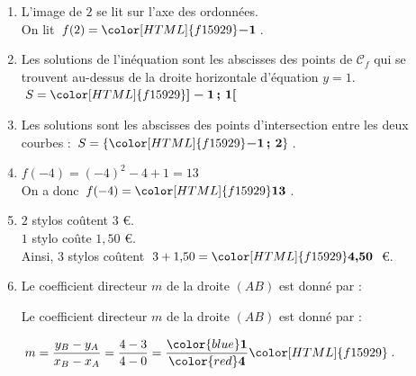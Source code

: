 \documentclass[a4paper,11pt,landscape,exos]{nsi} %
\begin{document}
\newpage

\begin{multicols}{2}
\maketitle

\begin{enumerate}[]

\item L'image de $2$ se lit sur l'axe des ordonnées. \\
              On lit $f(2)={\color[HTML]{f15929}\boldsymbol{-1}}$. 
\item Les solutions de l'inéquation sont les abscisses des points de $\mathcal{C}_f$ qui se trouvent au-dessus de la droite horizontale d'équation $y=1$.\\
    $S={\color[HTML]{f15929}\boldsymbol{]-1\,;\,1[}}$ 
\item Les solutions sont les abscisses des points d'intersection entre les deux courbes :
   $S=\{{\color[HTML]{f15929}\boldsymbol{-1\,;\,2}}\}$. 
\item $f(-4)=\left(-4 \right)^2 -4 +1 = 13$\\
    On a donc $f(-4)={\color[HTML]{f15929}\boldsymbol{13}}$.
\item $2$ stylos coûtent $3$ €.\\
          $1$ stylo coûte  $1{,}50$ €.\\
          Ainsi,   $3$ stylos coûtent $3+ 1{,}50 ={\color[HTML]{f15929}\boldsymbol{4{,}50}}$ €.
\item Le coefficient directeur $m$ de la droite $(AB)$ est donné par :

Le coefficient directeur $m$ de la droite $(AB)$ est donné par :

\medskip

            $m=\dfrac{y_B-y_A}{x_B-x_A}=\dfrac{4-3}{4-0}=\dfrac{{\color{blue}\boldsymbol{1}}}{{\color{red}\boldsymbol{4}}}{\color[HTML]{f15929}\boldsymbol{}}$.


\end{enumerate}
\end{multicols}
\end{document}
